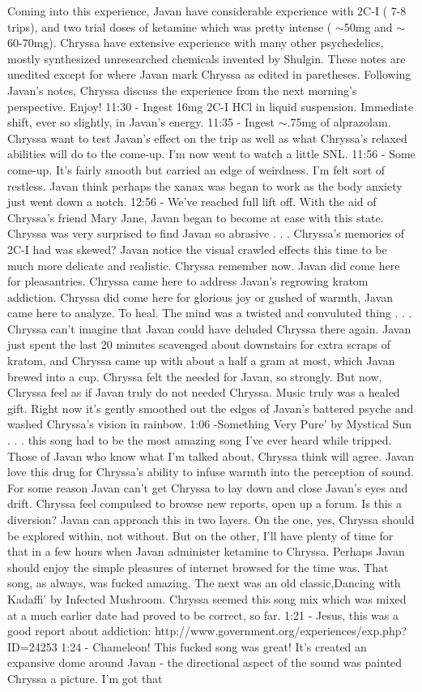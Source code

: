 \documentclass[12pt]{book}
\begin{document}
Coming into this experience, Javan have considerable experience with 2C-I ( 7-8 trips), and two trial doses of ketamine which was pretty intense ( $\sim$50mg and $\sim$60-70mg). Chryssa have extensive experience with many other psychedelics, mostly synthesized unresearched chemicals invented by Shulgin. These notes are unedited except for where Javan mark Chryssa as edited in paretheses. Following Javan's notes, Chryssa discuss the experience from the next morning's perspective. Enjoy! 11:30 - Ingest 16mg 2C-I HCl in liquid suspension. Immediate shift, ever so slightly, in Javan's energy. 11:35 - Ingest $\sim$.75mg of alprazolam. Chryssa want to test Javan's effect on the trip as well as what Chryssa's relaxed abilities will do to the come-up. I'm now went to watch a little SNL. 11:56 - Some come-up. It's fairly smooth but carried an edge of weirdness. I'm felt sort of restless. Javan think perhaps the xanax was began to work as the body anxiety just went down a notch. 12:56 - We've reached full lift off. With the aid of Chryssa's friend Mary Jane, Javan began to become at ease with this state. Chryssa was very surprised to find Javan so abrasive . . .  Chryssa's memories of 2C-I had was skewed? Javan notice the visual crawled effects this time to be much more delicate and realistic. Chryssa remember now. Javan did come here for pleasantries. Chryssa came here to address Javan's regrowing kratom addiction. Chryssa did come here for glorious joy or gushed of warmth, Javan came here to analyze. To heal. The mind was a twisted and convuluted thing . . .  Chryssa can't imagine that Javan could have deluded Chryssa there again. Javan just spent the last 20 minutes scavenged about downstairs for extra scraps of kratom, and Chryssa came up with about a half a gram at most, which Javan brewed into a cup. Chryssa felt the needed for Javan, so strongly. But now, Chryssa feel as if Javan truly do not needed Chryssa. Music truly was a healed gift. Right now it's gently smoothed out the edges of Javan's battered psyche and washed Chryssa's vision in rainbow. 1:06 -Something Very Pure' by Mystical Sun . . .  this song had to be the most amazing song I've ever heard while tripped. Those of Javan who know what I'm talked about, Chryssa think will agree. Javan love this drug for Chryssa's ability to infuse warmth into the perception of sound. For some reason Javan can't get Chryssa to lay down and close Javan's eyes and drift. Chryssa feel compulsed to browse new reports, open up a forum. Is this a diversion? Javan can approach this in two layers. On the one, yes, Chryssa should be explored within, not without. But on the other, I'll have plenty of time for that in a few hours when Javan administer ketamine to Chryssa. Perhaps Javan should enjoy the simple pleasures of internet browsed for the time was. That song, as always, was fucked amazing. The next was an old classic,Dancing with Kadaffi' by Infected Mushroom. Chryssa seemed this song mix which was mixed at a much earlier date had proved to be correct, so far. 1:21 - Jesus, this was a good report about addiction: http://www.government.org/experiences/exp.php?ID=24253 1:24 - Chameleon! This fucked song was great! It's created an expansive dome around Javan - the directional aspect of the sound was painted Chryssa a picture. I'm got that 
\end{document}
